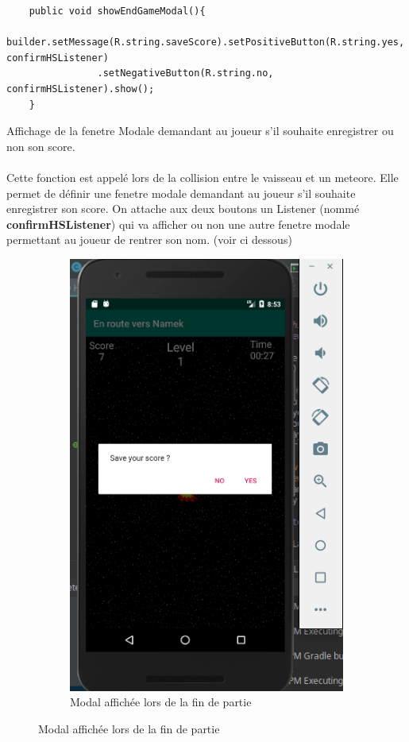 \documentclass{article}
\begin{document}
\begin{verbatim}
    public void showEndGameModal(){
        builder.setMessage(R.string.saveScore).setPositiveButton(R.string.yes, confirmHSListener)
                .setNegativeButton(R.string.no, confirmHSListener).show();
    }
\end{verbatim}
    Affichage de la fenetre Modale demandant au joueur s'il souhaite enregistrer ou non son score.
    

\paragraph{}
Cette fonction est appelé lors de la collision entre le vaisseau et un meteore. Elle permet de définir une fenetre modale demandant au joueur s'il souhaite enregistrer son score. On attache aux deux boutons un Listener (nommé \textbf{confirmHSListener}) qui va afficher ou non une autre fenetre modale permettant au joueur de rentrer son nom. (voir ci dessous)
\begin{figure}
\centering
 \begin{subfigure}[b]{0.4\textwidth}
  \includegraphics[width=\textwidth]{images/saveScore1.png}
  \caption{Modal affichée lors de la fin de partie}
 \end{subfigure}
\end{figure}
\end{document}
